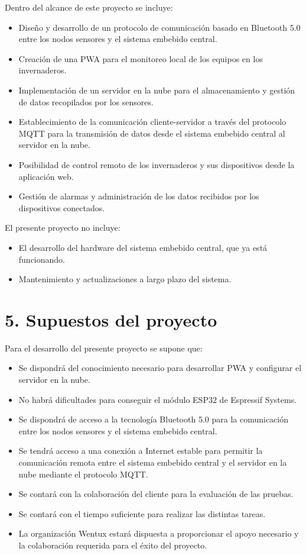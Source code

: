 \documentclass[
11pt, %
]{charter}
\begin{document}
Dentro del alcance de este proyecto se incluye:

\begin{itemize}
	\item Diseño y desarrollo de un protocolo de comunicación basado en Bluetooth 5.0 entre los nodos sensores y el sistema embebido central.
	\item Creación de una PWA para el monitoreo local de los equipos en los invernaderos.
	\item Implementación de un servidor en la nube para el almacenamiento y gestión de datos recopilados por los sensores.
	\item Establecimiento de la comunicación cliente-servidor a través del protocolo MQTT para la transmisión de datos desde el sistema embebido central al servidor en la nube.
	\item Posibilidad de control remoto de los invernaderos y sus dispositivos desde la aplicación web.
	\item Gestión de alarmas y administración de los datos recibidos por los dispositivos conectados.
\end{itemize}

El presente proyecto no incluye:

\begin{itemize}
	\item El desarrollo del hardware del sistema embebido central, que ya está funcionando.
	\item Mantenimiento y actualizaciones a largo plazo del sistema.
\end{itemize}



\section{5. Supuestos del proyecto}
\label{sec:supuestos}


Para el desarrollo del presente proyecto se supone que: 

\begin{itemize}
	\item Se dispondrá del conocimiento necesario para desarrollar PWA y configurar el servidor en la nube.
	\item No habrá dificultades para conseguir el módulo ESP32 de Espressif Systems.
	\item Se dispondrá de acceso a la tecnología Bluetooth 5.0 para la comunicación entre los nodos sensores y el sistema embebido central.
	\item  Se tendrá acceso a una conexión a Internet estable para permitir la comunicación remota entre el sistema embebido central y el servidor en la nube mediante el protocolo MQTT.
	\item Se contará con la colaboración del cliente para la evaluación de las pruebas.
	\item Se contará con el tiempo suficiente para realizar las distintas tareas.
	\item La organización Wentux estará dispuesta a proporcionar el apoyo necesario y la colaboración requerida para el éxito del proyecto.
\end{itemize}
\end{document}
